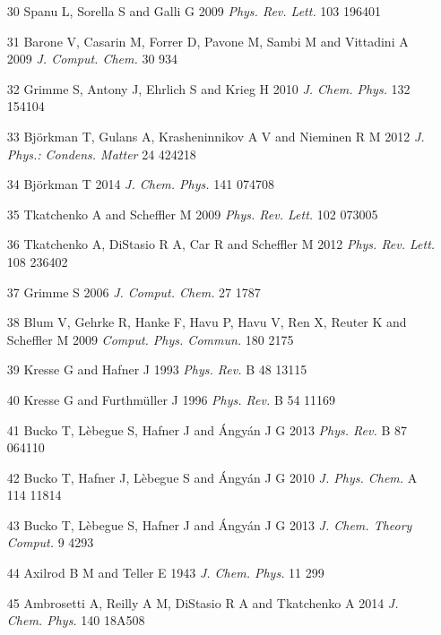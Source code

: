 \documentclass{article}
\begin{document}
\begin{itemize}
\item 
[30] Spanu L, Sorella S and Galli G 2009 \textit{Phys. Rev. Lett.} 103 196401

\item 
[31] Barone V, Casarin M, Forrer D, Pavone M, Sambi M and Vittadini A 2009 \textit{J. Comput. Chem.} 30 934

\item 
[32] Grimme S, Antony J, Ehrlich S and Krieg H 2010 \textit{J. Chem. Phys.} 132 154104

\item 
[33] Björkman T, Gulans A, Krasheninnikov A V and Nieminen R M 2012 \textit{J. Phys.: Condens. Matter} 24 424218

\item 
[34] Björkman T 2014 \textit{J. Chem. Phys.} 141 074708

\item 
[35] Tkatchenko A and Scheffler M 2009 \textit{Phys. Rev. Lett.} 102 073005

\item 
[36] Tkatchenko A, DiStasio R A, Car R and Scheffler M 2012 \textit{Phys. Rev. Lett.} 108 236402

\item 
[37] Grimme S 2006 \textit{J. Comput. Chem.} 27 1787

\item 
[38] Blum V, Gehrke R, Hanke F, Havu P, Havu V, Ren X, Reuter K and Scheffler M 2009 \textit{Comput. Phys. Commun.} 180 2175

\item 
[39] Kresse G and Hafner J 1993 \textit{Phys. Rev.} B 48 13115

\item 
[40] Kresse G and Furthmüller J 1996 \textit{Phys. Rev.} B 54 11169

\item 
[41] Bucko T, Lèbegue S, Hafner J and Ángyán J G 2013 \textit{Phys. Rev.} B 87 064110

\item 
[42] Bucko T, Hafner J, Lèbegue S and Ángyán J G 2010 \textit{J. Phys. Chem.} A 114 11814

\item 
[43] Bucko T, Lèbegue S, Hafner J and Ángyán J G 2013 \textit{J. Chem. Theory Comput.} 9 4293

\item 
[44] Axilrod B M and Teller E 1943 \textit{J. Chem. Phys.} 11 299

\item 
[45] Ambrosetti A, Reilly A M, DiStasio R A and Tkatchenko A 2014 \textit{J. Chem. Phys.} 140 18A508


\end{itemize}
\end{document}
